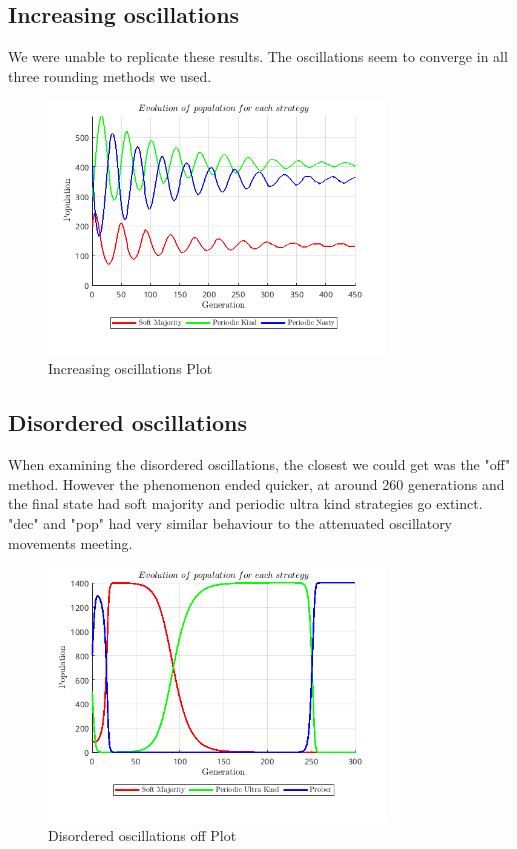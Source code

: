 \subsection{Increasing oscillations}
We were unable to replicate these results. The oscillations seem to converge in all three rounding methods we used.
\begin{figure}[H]
    \centering
    \includegraphics[width=0.8\textwidth]{media/meetings/increasing_oscillations_dec.png}
    \caption{Increasing oscillations Plot}
\end{figure}

\subsection{Disordered oscillations}
When examining the disordered oscillations, the closest we could get was the "off" method. However the phenomenon ended quicker, at around 260 generations and the final state had soft majority and periodic ultra kind strategies go extinct. "dec" and "pop" had very similar behaviour to the attenuated oscillatory movements meeting.
\begin{figure}[H]
    \centering
    \includegraphics[width=0.8\textwidth]{media/meetings/disordered_oscillations_off.png}
    \caption{Disordered oscillations off Plot}
\end{figure}

